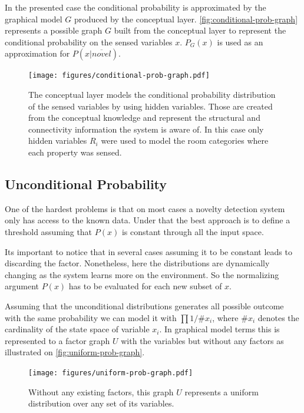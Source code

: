 \documentclass[runningheads,a4paper]{llncs}
\begin{document}
In the presented case the conditional probability is approximated by the graphical model $G$
produced by the conceptual layer.
\autoref{fig:conditional-prob-graph} represents a possible graph $G$ built from the conceptual
layer to represent the conditional probability on the sensed variables $x$.
$P_G(x)$ is used as an approximation for $P(x|\overline{novel})$.

\begin{figure}[h]
\centering
\texttt{[image: figures/conditional-prob-graph.pdf]}
\caption{\label{fig:conditional-prob-graph}The conceptual layer models the conditional
         probability distribution of the sensed variables by using hidden variables.
         Those are created from the conceptual knowledge and represent the structural
         and connectivity information the system is aware of.
         In this case only hidden variables $R_i$ were used to model the room categories
         where each property was sensed.}
\end{figure}

\subsection{Unconditional Probability}
\label{sec:unconditional-prob}
One of the hardest problems is that on most cases a novelty detection system only
has access to the known data.
Under that the best approach is to define a threshold assuming that $P(x)$ is
constant through all the input space.

Its important to notice that in several cases assuming it to be constant leads to
discarding the factor.
Nonetheless, here the distributions are dynamically changing as the system learns
more on the environment.
So the normalizing argument $P(x)$ has to be evaluated for each new subset of $x$.

Assuming that the unconditional distributions generates all possible outcome with
the same probability we can model it with $\prod{1/\# x_i}$,
where $\# x_i$ denotes the cardinality of the state space of variable $x_i$.
In graphical model terms this is represented to a factor graph $U$ with the
variables but without any factors as illustrated on \autoref{fig:uniform-prob-graph}.

\begin{figure}
\centering
\texttt{[image: figures/uniform-prob-graph.pdf]}
\caption{\label{fig:uniform-prob-graph}Without any existing factors, this graph $U$ represents a
         uniform distribution over any set of its variables.}
\end{figure}
\end{document}
